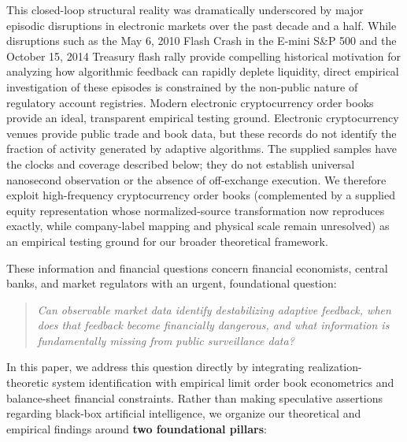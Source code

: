 \documentclass[12pt]{article}
\theoremstyle{definition}
\theoremstyle{remark}
\begin{document}
This closed-loop structural reality was dramatically underscored by major episodic disruptions in electronic markets over the past decade and a half. While disruptions such as the May 6, 2010 Flash Crash in the E-mini S\&P 500 and the October 15, 2014 Treasury flash rally provide compelling historical motivation for analyzing how algorithmic feedback can rapidly deplete liquidity, direct empirical investigation of these episodes is constrained by the non-public nature of regulatory account registries. Modern electronic cryptocurrency order books provide an ideal, transparent empirical testing ground. Electronic cryptocurrency venues provide public trade and book data, but these records do not identify the fraction of activity generated by adaptive algorithms. The supplied samples have the clocks and coverage described below; they do not establish universal nanosecond observation or the absence of off-exchange execution. We therefore exploit high-frequency cryptocurrency order books (complemented by a supplied equity representation whose normalized-source transformation now reproduces exactly, while company-label mapping and physical scale remain unresolved) as an empirical testing ground for our broader theoretical framework.

These information and financial questions concern financial economists, central banks, and market regulators with an urgent, foundational question:
\begin{quote}
\centering
\emph{Can observable market data identify destabilizing adaptive feedback, when does that feedback become financially dangerous, and what information is fundamentally missing from public surveillance data?}
\end{quote}

In this paper, we address this question directly by integrating realization-theoretic system identification with empirical limit order book econometrics and balance-sheet financial constraints. Rather than making speculative assertions regarding black-box artificial intelligence, we organize our theoretical and empirical findings around \textbf{two foundational pillars}:
\end{document}
